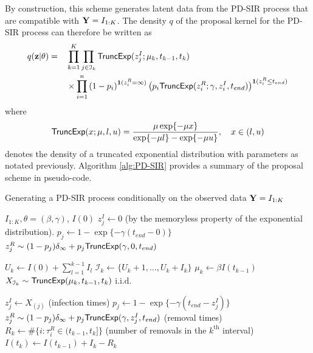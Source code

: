 \documentclass[11pt]{article}
\begin{document}
	By construction, this scheme generates latent data from the PD-SIR process that are compatible with $\mathbf{Y} = I_{1:K}$. The density $q$ of the proposal kernel for the PD-SIR process can therefore be written as
	\begin{alignat}{3}
	\label{eq:q}
		q(\mathbf{z}|\theta) 
		& = && \prod_{k=1}^K \prod_{j\in\mathcal{I}_k} \textsf{TruncExp}(z^I_j; \mu_{k}, t_{k-1}, t_{k}) \\
		& && \times \prod_{i=1}^{n} \left( 1 - p_i \right)^{\mathbf{1}(z^R_i = \infty)} \left( p_i \textsf{TruncExp}(z^R_i; \gamma, z^I_i, t_{end}) \right)^{\mathbf{1}(z^R_i \le t_{end})}
	\end{alignat}
	where %
	$$\textsf{TruncExp}(x; \mu, l, u) = \dfrac{\mu \exp\{-\mu x\}}{\exp\{-\mu l\} - \exp\{-\mu u\}}, \quad x \in (l, u)$$
	denotes the density of a truncated exponential distribution with parameters as notated previously. Algorithm \ref{alg:PD-SIR} provides a summary of the proposal scheme in pseudo-code.
	
	\begin{algorithm}
		\caption{Generating a PD-SIR process conditionally on the observed data $\mathbf{Y} = I_{1:K}$}
		\label{alg:PD-SIR}
		\begin{algorithmic}
			\REQUIRE $I_{1:K}, \theta = (\beta, \gamma)$, $I(0)$
    			\STATE $z^I_j \leftarrow 0$ (by the memoryless property of the exponential distribution).
    			\STATE $p_j \leftarrow 1 - \exp\{-\gamma (t_{end} - 0)\}$
    			\STATE $z^R_j \sim (1 - p_j) \delta_\infty + p_j \textsf{TruncExp}(\gamma, 0, t_{end})$
			\ENDFOR
			
    			\STATE $U_k \leftarrow I(0) + \sum_{l=1}^{k-1} I_l$
    			\STATE $\mathcal{I}_k \leftarrow \{U_k + 1, \dots, U_k + I_k\}$	
    			\STATE $\mu_k \leftarrow \beta I(t_{k-1})$
    			\STATE $X_{\mathcal{I}_k} \sim \textsf{TruncExp}(\mu_k, t_{k-1}, t_k)$ i.i.d.\
    			
        			\STATE $z^I_j \leftarrow X_{(j)}$ (infection times)
        			\STATE $p_j \leftarrow 1 - \exp\{-\gamma(t_{end} - z^I_j)\}$
        			\STATE $z^R_j \sim (1 - p_j) \delta_\infty + p_j \textsf{TruncExp}(\gamma, z^I_j, t_{end})$ (removal times)
    			\ENDFOR
    			\STATE $R_k \leftarrow \#\{i:\tau^R_i \in (t_{k-1}, t_k]\}$ (number of removals in the $k^{\text{th}}$ interval)
    			\STATE $I(t_k) \leftarrow I(t_{k-1}) + I_k - R_k$
			\ENDFOR
		\end{algorithmic}
	\end{algorithm}
	
\end{document}
